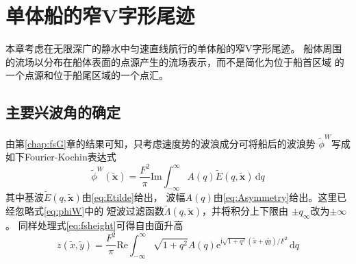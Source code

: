 \chapter{单体船的窄V字形尾迹}
\label{chap:monohull}

本章考虑在无限深广的静水中匀速直线航行的单体船的窄V字形尾迹。
船体周围的流场以分布在船体表面的点源产生的流场表示，而不是简化为位于船首区域
的一个点源和位于船尾区域的一个点汇。

\section{主要兴波角的确定}
\label{sec:psimaxcalc}

由第\ref{chap:fsG}章的结果可知，只考虑速度势的波浪成分可将船后的波浪势
$\tilde{\phi}^W$写成如下Fourier-Kochin表达式
\begin{equation}
  \tilde{\phi}^W(\tilde{\mathbf{x}})=\frac{F^2}{\pi}\mathrm{Im}
  \int_{-\infty}^{\infty}
  A(q)\tilde{E}(q,\tilde{\mathbf{x}})\,\mathrm{d}q
  \label{eq:fkrepresent}
\end{equation}
其中基波$\tilde{E}(q,\tilde{\mathbf{x}})$由\eqref{eq:Etilde}给出，
波幅$A(q)$由\eqref{eq:Asymmetry}给出。这里已经忽略式\eqref{eq:phiW}中的
短波过滤函数$\tilde{\Lambda}(q,\tilde{\mathbf{x}})$，并将积分上下限由
$\pm q_{\infty}$改为$\pm\infty$。
同样处理式\eqref{eq:fsheight}可得自由面升高
\begin{equation}
  z(\tilde{x},\tilde{y})=\frac{F^2}{\pi}\mathrm{Re}\int_{-\infty}^{\infty}
  \sqrt{1+q^2}A(q)\mathrm{e}^{\mathrm{i}\sqrt{1+q^2}(\tilde{x}+q\tilde{y})/F^2}
  \,\mathrm{d}q
  \label{eq:freesurfelev}
\end{equation}

